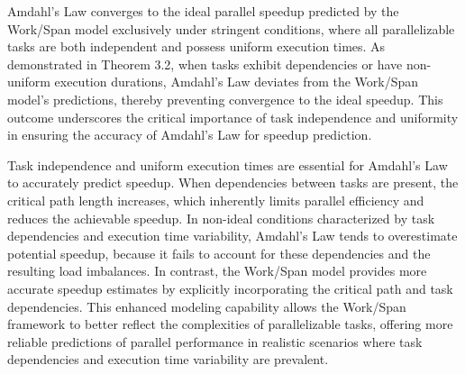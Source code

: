 \documentclass[
  a4paper, %
]{kaohandt}
\begin{document}
Amdahl's Law converges to the ideal parallel speedup predicted by the Work/Span model exclusively under stringent conditions, where all parallelizable tasks are both independent and possess uniform execution times. As demonstrated in Theorem 3.2, when tasks exhibit dependencies or have non-uniform execution durations, Amdahl's Law deviates from the Work/Span model's predictions, thereby preventing convergence to the ideal speedup. This outcome underscores the critical importance of task independence and uniformity in ensuring the accuracy of Amdahl's Law for speedup prediction.

Task independence and uniform execution times are essential for Amdahl's Law to accurately predict speedup. When dependencies between tasks are present, the critical path length increases, which inherently limits parallel efficiency and reduces the achievable speedup. In non-ideal conditions characterized by task dependencies and execution time variability, Amdahl's Law tends to overestimate potential speedup, because it fails to account for these dependencies and the resulting load imbalances. In contrast, the Work/Span model provides more accurate speedup estimates by explicitly incorporating the critical path and task dependencies. This enhanced modeling capability allows the Work/Span framework to better reflect the complexities of parallelizable tasks, offering more reliable predictions of parallel performance in realistic scenarios where task dependencies and execution time variability are prevalent.






\end{document}
